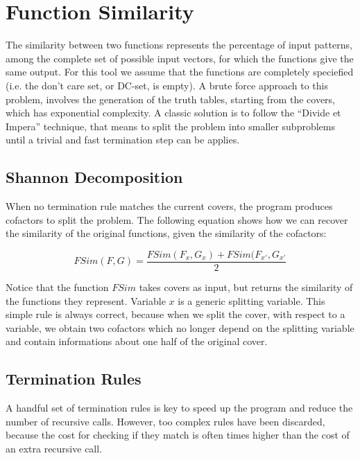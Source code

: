 \documentclass{acm_proc_article-sp}
\begin{document}
\section{Function Similarity}

The similarity between two functions represents the percentage of input patterns,
among the complete set of possible input vectors, for which the functions give
the same output.
For this tool we assume that the functions are completely speciefied (i.e. the
don't care set, or DC-set, is empty).
A brute force approach to this problem, involves the generation of the truth
tables, starting from the covers, which has exponential complexity. A classic
solution is to follow the ``Divide et Impera'' technique, that means to split
the problem into smaller subproblems until a trivial and fast termination
step can be applies.

\subsection{Shannon Decomposition}

When no termination rule matches the current covers, the program produces
cofactors to split the problem. The following equation shows how we can
recover the similarity of the original functions, given the similarity of the
cofactors:

\begin{equation}
  \label{eq:shannon}
  FSim(F, G) = \frac{FSim(F_{x}, G_{x}) + FSim(F_{x'}, G_{x'}}{2}
\end{equation}

Notice that the function $FSim$ takes covers as input, but returns the similarity
of the functions they represent. Variable $x$ is a generic splitting variable.
This simple rule is always correct, because when we split the cover, with respect
to a variable, we obtain two cofactors which no longer depend on the splitting
variable and contain informations about one half of the original cover.

\subsection{Termination Rules}

A handful set of termination rules is key to speed up the program and reduce
the number of recursive calls. However, too complex rules have been discarded,
because the cost for checking if they match is often times higher than the cost
of an extra recursive call.
\end{document}
